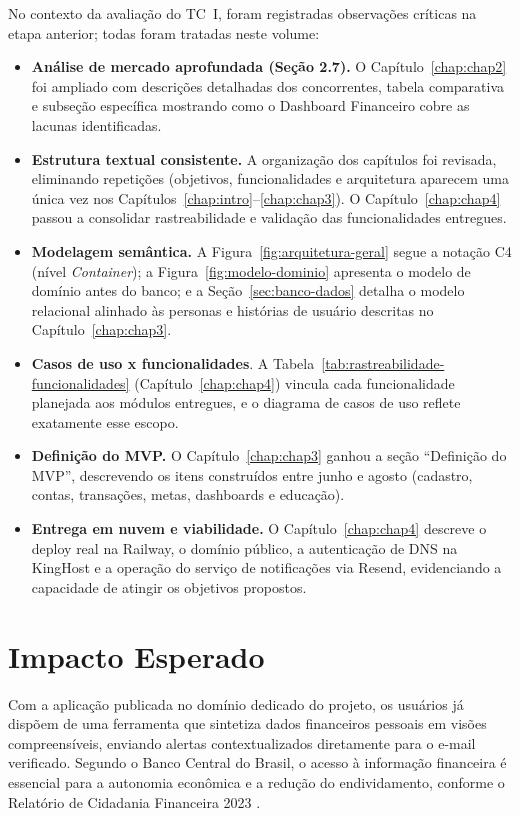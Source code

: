 No contexto da avaliação do TC~I, foram registradas observações críticas na etapa anterior; todas foram tratadas neste volume:
\begin{itemize}
    \item \textbf{Análise de mercado aprofundada (Seção 2.7).} O Capítulo~\ref{chap:chap2} foi ampliado com descrições detalhadas dos concorrentes, tabela comparativa e subseção específica mostrando como o Dashboard Financeiro cobre as lacunas identificadas.
    \item \textbf{Estrutura textual consistente.} A organização dos capítulos foi revisada, eliminando repetições (objetivos, funcionalidades e arquitetura aparecem uma única vez nos Capítulos~\ref{chap:intro}--\ref{chap:chap3}). O Capítulo~\ref{chap:chap4} passou a consolidar rastreabilidade e validação das funcionalidades entregues.
    \item \textbf{Modelagem semântica.} A Figura~\ref{fig:arquitetura-geral} segue a notação C4 (nível \textit{Container}); a Figura~\ref{fig:modelo-dominio} apresenta o modelo de domínio antes do banco; e a Seção~\ref{sec:banco-dados} detalha o modelo relacional alinhado às personas e histórias de usuário descritas no Capítulo~\ref{chap:chap3}.
    \item \textbf{Casos de uso x funcionalidades}. A Tabela~\ref{tab:rastreabilidade-funcionalidades} (Capítulo~\ref{chap:chap4}) vincula cada funcionalidade planejada aos módulos entregues, e o diagrama de casos de uso reflete exatamente esse escopo.
    \item \textbf{Definição do MVP.} O Capítulo~\ref{chap:chap3} ganhou a seção ``Definição do MVP'', descrevendo os itens construídos entre junho e agosto (cadastro, contas, transações, metas, dashboards e educação).
    \item \textbf{Entrega em nuvem e viabilidade.} O Capítulo~\ref{chap:chap4} descreve o deploy real na Railway, o domínio público, a autenticação de DNS na KingHost e a operação do serviço de notificações via Resend, evidenciando a capacidade de atingir os objetivos propostos.
\end{itemize}

\section{Impacto Esperado}

Com a aplicação publicada no domínio dedicado do projeto, os usuários já dispõem de uma ferramenta que sintetiza dados financeiros pessoais em visões compreensíveis, enviando alertas contextualizados diretamente para o e-mail verificado. Segundo o Banco Central do Brasil, o acesso à informação financeira é essencial para a autonomia econômica e a redução do endividamento, conforme o Relatório de Cidadania Financeira 2023 \cite{BCB2023CIDADANIA}.


